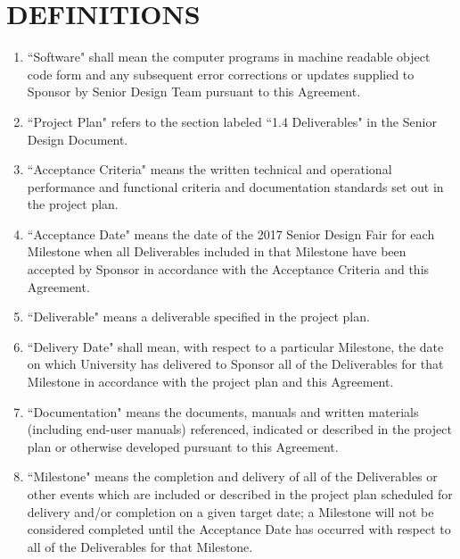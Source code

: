 \documentclass[11pt]{article}
\begin{document}
\section{DEFINITIONS }
\begin{enumerate}  \itemsep4pt \parskip0pt 
\item ``Software" shall mean the computer programs in machine readable object code form and any subsequent error corrections or updates supplied to Sponsor by Senior Design Team pursuant to this Agreement.

\item ``Project Plan" refers to the section labeled ``1.4 Deliverables" in the Senior Design Document.    

\item ``Acceptance Criteria" means the written technical and operational performance and functional criteria and documentation standards set out in the project plan.    

\item ``Acceptance Date" means the date of the 2017 Senior Design Fair for each Milestone when all Deliverables included in that Milestone have been accepted by Sponsor in accordance with the Acceptance Criteria and this Agreement. 

\item  ``Deliverable" means a deliverable specified in the project plan.    

\item  ``Delivery Date" shall mean, with respect to a particular Milestone, the date on which University has delivered to Sponsor all of the Deliverables for that Milestone in accordance with the project plan and this Agreement.    

\item  ``Documentation" means the documents, manuals and written materials (including end-user manuals) referenced, indicated or described in the project plan or otherwise developed pursuant to this Agreement.    

\item  ``Milestone" means the completion and delivery of all of the Deliverables or other events which are included or described in the project plan scheduled for delivery and/or completion on a given target date; a Milestone will not be considered completed until the Acceptance Date has occurred with respect to all of the Deliverables for that Milestone.  
\end{enumerate}
\end{document}
